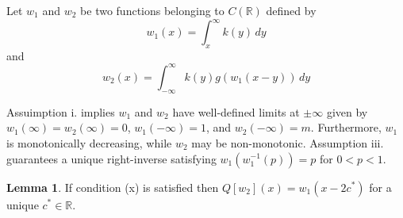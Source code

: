 \documentclass[11pt]{article}
\theoremstyle{definition}
\newtheorem{lem}[thm]{Lemma}
\numberwithin{equation}{section}
\numberwithin{thm}{section}
\begin{document}
 Let $w_1$ and $w_2$ be two functions belonging to $C(\mathbb R)$ defined by
\begin{equation} \label{w1}
w_1(x) = \int_x^\infty k(y) \, dy
\end{equation}
and
\begin{equation} \label{w2}
w_2(x) = \int_{-\infty}^{\infty} k(y) g(w_1(x-y)) \, dy 
\end{equation}

Assuimption i. implies $w_1$ and $w_2$ have well-defined limits at $\pm\infty$ given by $w_1(\infty)=w_2(\infty)=0$, $w_1(-\infty)=1$, and $w_2(-\infty)=m$. Furthermore, $w_1$ is monotonically decreasing, while $w_2$ may be non-monotonic. Assumption iii. guarantees a unique right-inverse satisfying $w_1(w_1^{-1}(p))=p$ for $0<p<1$.

\begin{lem} \label{lemma1}
If condition (x) is satisfied then $Q[w_2](x)=w_1(x-2c^*)$ for a unique $c^*\in\mathbb R$.
\end{lem}
\end{document}
